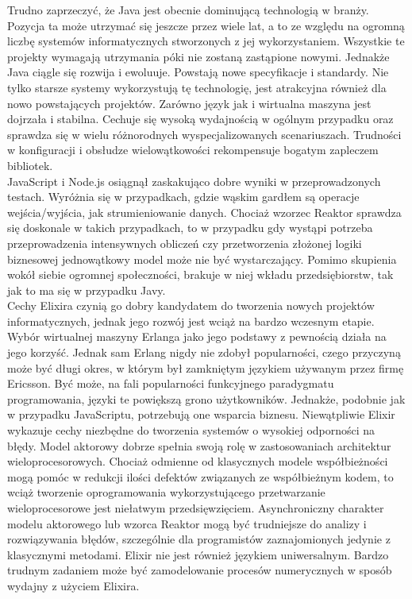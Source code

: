 \documentclass[12pt,twoside]{article}
\begin{document}
Trudno zaprzeczyć, że Java jest obecnie dominującą technologią w branży.
Pozycja ta może utrzymać się jeszcze przez wiele lat, a to ze względu na
ogromną liczbę systemów informatycznych stworzonych z jej
wykorzystaniem. Wszystkie te projekty wymagają utrzymania póki nie
zostaną zastąpione nowymi. Jednakże Java ciągle się rozwija i ewoluuje.
Powstają nowe specyfikacje i standardy. Nie tylko starsze systemy
wykorzystują tę technologię, jest atrakcyjna również dla nowo
powstających projektów. Zarówno język jak i wirtualna maszyna jest
dojrzała i stabilna. Cechuje się wysoką wydajnością w ogólnym przypadku
oraz sprawdza się w wielu różnorodnych wyspecjalizowanych scenariuszach.
Trudności w konfiguracji i obsłudze wielowątkowości rekompensuje bogatym
zapleczem bibliotek.\\
JavaScript i Node.js osiągnął zaskakująco dobre wyniki w
przeprowadzonych testach. Wyróżnia się w przypadkach, gdzie wąskim
gardłem są operacje wejścia/wyjścia, jak strumieniowanie danych. Chociaż
wzorzec Reaktor sprawdza się doskonale w takich przypadkach, to w
przypadku gdy wystąpi potrzeba przeprowadzenia intensywnych obliczeń czy
przetworzenia złożonej logiki biznesowej jednowątkowy model może nie być
wystarczający. Pomimo skupienia wokół siebie ogromnej społeczności,
brakuje w niej wkładu przedsiębiorstw, tak jak to ma się w przypadku
Javy.\\
Cechy Elixira czynią go dobry kandydatem do tworzenia nowych projektów
informatycznych, jednak jego rozwój jest wciąż na bardzo wczesnym
etapie. Wybór wirtualnej maszyny Erlanga jako jego podstawy z pewnością
działa na jego korzyść. Jednak sam Erlang nigdy nie zdobył popularności,
czego przyczyną może być długi okres, w którym był zamkniętym językiem
używanym przez firmę Ericsson. Być może, na fali popularności
funkcyjnego paradygmatu programowania, języki te powiększą grono
użytkowników. Jednakże, podobnie jak w przypadku JavaScriptu, potrzebują
one wsparcia biznesu. Niewątpliwie Elixir wykazuje cechy niezbędne do
tworzenia systemów o wysokiej odporności na błędy. Model aktorowy dobrze
spełnia swoją rolę w zastosowaniach architektur wieloprocesorowych.
Chociaż odmienne od klasycznych modele współbieżności mogą pomóc w
redukcji ilości defektów związanych ze współbieżnym kodem, to wciąż
tworzenie oprogramowania wykorzystującego przetwarzanie wieloprocesorowe
jest niełatwym przedsięwzięciem. Asynchroniczny charakter modelu
aktorowego lub wzorca Reaktor mogą być trudniejsze do analizy i
rozwiązywania błędów, szczególnie dla programistów zaznajomionych
jedynie z klasycznymi metodami. Elixir nie jest również językiem
uniwersalnym. Bardzo trudnym zadaniem może być zamodelowanie procesów
numerycznych w sposób wydajny z użyciem Elixira.
\end{document}
